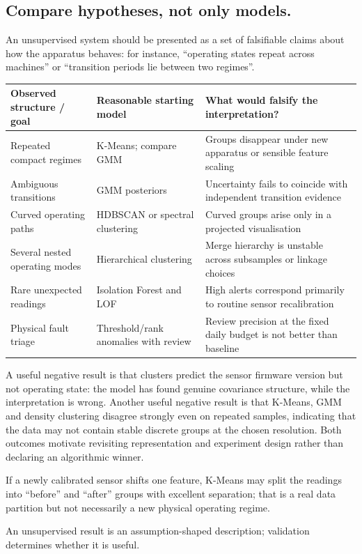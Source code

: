 \subsection{Compare hypotheses, not only models.}
An unsupervised system should be presented as a set of falsifiable claims about how the apparatus behaves: for instance, ``operating states repeat across machines'' or ``transition periods lie between two regimes''.
\begin{center}
\begingroup\ULtight\small
\begin{tabular}{@{}p{.23\linewidth}p{.27\linewidth}p{.43\linewidth}@{}}
\hline
\textbf{Observed structure / goal} & \textbf{Reasonable starting model} & \textbf{What would falsify the interpretation?}\\\hline
Repeated compact regimes & K-Means; compare GMM & Groups disappear under new apparatus or sensible feature scaling\\
Ambiguous transitions & GMM posteriors & Uncertainty fails to coincide with independent transition evidence\\
Curved operating paths & HDBSCAN or spectral clustering & Curved groups arise only in a projected visualisation\\
Several nested operating modes & Hierarchical clustering & Merge hierarchy is unstable across subsamples or linkage choices\\
Rare unexpected readings & Isolation Forest and LOF & High alerts correspond primarily to routine sensor recalibration\\
Physical fault triage & Threshold/rank anomalies with review & Review precision at the fixed daily budget is not better than baseline\\\hline
\end{tabular}
\label{tab:sensor-hypotheses}
\endgroup
\end{center}
A useful negative result is that clusters predict the sensor firmware version but not operating state: the model has found genuine covariance structure, while the interpretation is wrong.
Another useful negative result is that K-Means, GMM and density clustering disagree strongly even on repeated samples, indicating that the data may not contain stable discrete groups at the chosen resolution.
Both outcomes motivate revisiting representation and experiment design rather than declaring an algorithmic winner.

\begin{calloutexample}
If a newly calibrated sensor shifts one feature, K-Means may split the readings into ``before'' and ``after'' groups with excellent separation; that is a real data partition but not necessarily a new physical operating regime.
\end{calloutexample}

\begin{calloutmemoryhook}
An unsupervised result is an assumption-shaped description; validation determines whether it is useful.
\end{calloutmemoryhook}
